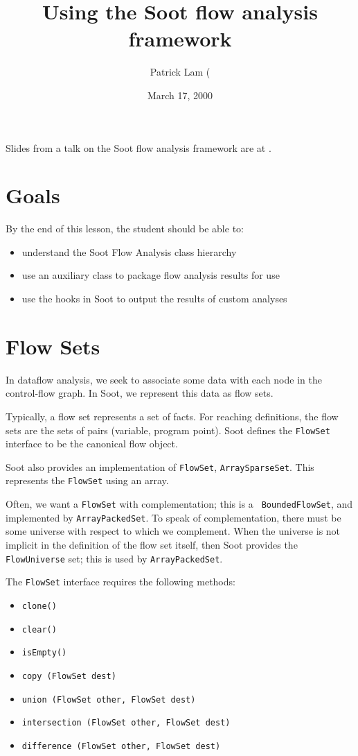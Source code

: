 \documentclass{article}
\title{Using the Soot flow analysis framework}
\author{Patrick Lam (\htmladdnormallink{plam@sable.mcgill.ca)}{mailto:plam@sable.mcgill.ca}}
\date{March 17, 2000}
\begin{document}
\maketitle

Slides from a talk on the Soot flow analysis framework
are at .

\section{Goals}

By the end of this lesson, the student should be able to:
\begin{itemize}
\item understand the Soot Flow Analysis class hierarchy
\item use an auxiliary class to package flow analysis results for use
\item use the hooks in Soot to output the results of custom
analyses
\end{itemize}

\section{Flow Sets}

In dataflow analysis, we seek to associate some data with each node
in the control-flow graph.  In Soot, we represent this data as flow
sets.

Typically, a flow set represents a set of facts.  For reaching
definitions, the flow sets are the sets of pairs (variable, program
point).  Soot defines the {\tt FlowSet} interface to be the canonical
flow object.

Soot also provides an implementation of {\tt FlowSet}, 
{\tt ArraySparseSet}.  This represents the {\tt FlowSet} using an
array.

Often, we want a {\tt FlowSet} with complementation; this is a {\tt
BoundedFlowSet}, and implemented by {\tt ArrayPackedSet}.  To speak of
complementation, there must be some universe with respect to which we
complement.  When the universe is not implicit in the definition of
the flow set itself, then Soot provides the {\tt FlowUniverse} set;
this is used by {\tt ArrayPackedSet}.

The {\tt FlowSet} interface requires the following methods:
\begin{itemize}
\item {\tt clone()}
\item {\tt clear()}
\item {\tt isEmpty()}
\item {\tt copy (FlowSet dest)}
\item {\tt union (FlowSet other, FlowSet dest)}
\item {\tt intersection (FlowSet other, FlowSet dest)}
\item {\tt difference (FlowSet other, FlowSet dest)}
\end{itemize}
\end{document}
